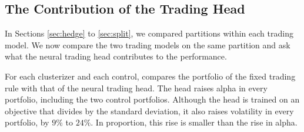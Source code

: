 \subsection{The Contribution of the Trading Head}
\label{sec:head}

In Sections \ref{sec:hedge} to \ref{sec:split}, we compared partitions within each trading model. We now compare the two trading models on the same partition and ask what the neural trading head contributes to the performance.





For each clusterizer and each control,  compares the portfolio of the fixed trading rule with that of the neural trading head.  The head raises alpha in every portfolio, including the two control portfolios. Although the head is trained on an objective that divides by the standard deviation, it also raises volatility in every portfolio, by $9\%$ to $24\%$. In proportion, this rise is smaller than the rise in alpha.

